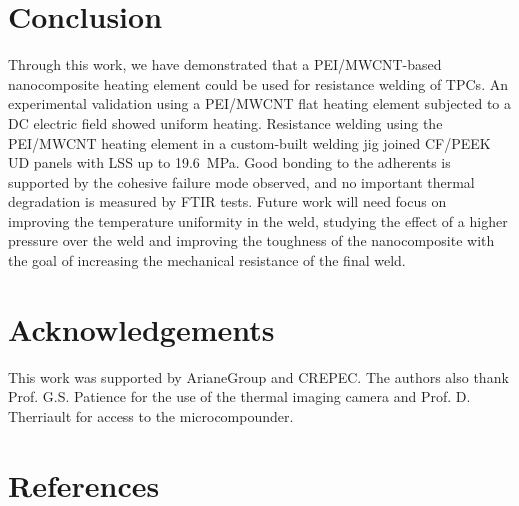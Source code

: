 \documentclass[11pt,review,times]{elsarticle}
\begin{document}
\FloatBarrier

							\section{Conclusion}

Through this work, we have demonstrated that a PEI/MWCNT-based nanocomposite heating element could be used for resistance welding of TPCs. 
An experimental validation using a PEI/MWCNT flat heating element subjected to a DC electric field showed uniform heating. 
Resistance welding using the PEI/MWCNT heating element in a custom-built welding jig joined CF/PEEK UD panels with LSS up to \SI{19.6}{\MPa}. 
Good bonding to the adherents is supported by the cohesive failure mode observed, and no important thermal degradation is measured by FTIR tests. 
Future work will need focus on improving the temperature uniformity in the weld, studying the effect of a higher pressure over the weld and improving the toughness of the nanocomposite with the goal of increasing the mechanical resistance of the final weld.

							\section{Acknowledgements}

This work was supported by ArianeGroup and CREPEC. 
The authors also thank Prof. G.S. Patience for the use of the thermal imaging camera and Prof. D. Therriault for access to the microcompounder. 

							\section*{References}





\pagebreak
\end{document}
